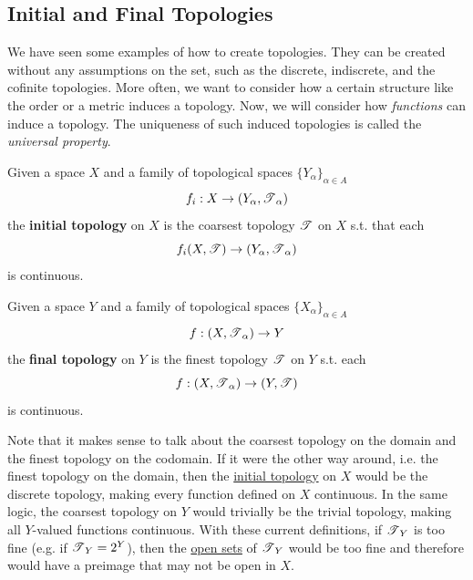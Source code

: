 \subsection{Initial and Final Topologies} 

  We have seen some examples of how to create topologies. They can be created without any assumptions on the set, such as the discrete, indiscrete, and the cofinite topologies. More often, we want to consider how a certain structure like the order or a metric induces a topology. Now, we will consider how \textit{functions} can induce a topology. The uniqueness of such induced topologies is called the \textit{universal property}. 

  \begin{definition}
    \label{def:initial-topology}
    Given a space $X$ and a family of topological spaces $\{Y_\alpha\}_{\alpha \in A}$ 
    \begin{equation}
      f_i : X \rightarrow (Y_\alpha, \operatorname{\mathscr{T}}_\alpha)
    \end{equation} 
    the \textbf{initial topology} on $X$ is the coarsest topology $\operatorname{\mathscr{T}}$ on $X$ s.t. that each 
    \begin{equation}
      f_i (X, \operatorname{\mathscr{T}}) \rightarrow (Y_\alpha, \operatorname{\mathscr{T}}_\alpha)
    \end{equation}
    is continuous. 
  \end{definition}

  \begin{definition}
    \label{def:final-topology}
    Given a space $Y$ and a family of topological spaces $\{X_\alpha\}_{\alpha \in A}$ 
    \begin{equation}
      f: (X, \operatorname{\mathscr{T}}_\alpha) \rightarrow Y
    \end{equation}
    the \textbf{final topology} on $Y$ is the finest topology $\operatorname{\mathscr{T}}$ on $Y$ s.t. each 
    \begin{equation}
      f: (X, \operatorname{\mathscr{T}}_\alpha) \rightarrow (Y, \operatorname{\mathscr{T}})
    \end{equation}
    is continuous. 
  \end{definition}

  Note that it makes sense to talk about the coarsest topology on the domain and the finest topology on the codomain. If it were the other way around, i.e. the finest topology on the domain, then the \hyperref[def:initial-topology]{initial topology} on $X$ would be the discrete topology, making every function defined on $X$ continuous. In the same logic, the coarsest topology on $Y$ would trivially be the trivial topology, making all $Y$-valued functions continuous. With these current definitions, if $\operatorname{\mathscr{T}}_Y$ is too fine (e.g. if $\operatorname{\mathscr{T}}_Y = 2^Y$), then the \hyperref[def:open-set]{open sets} of $\operatorname{\mathscr{T}}_Y$ would be too fine and therefore would have a preimage that may not be open in $X$. 

